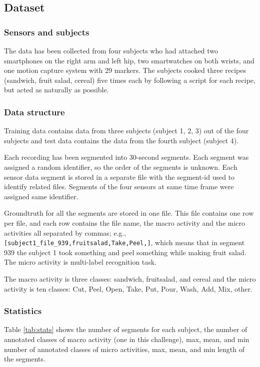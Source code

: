 \documentclass{svmult}
\begin{document}
\subsection{Dataset}
\label{sec:dataset}
\subsubsection{Sensors and subjects}
The data has been collected from four subjects who had attached two smartphones on the right arm and left hip, two smartwatches on both wrists, and one motion capture system with 29 markers. The subjects cooked three recipes (sandwich, fruit salad, cereal) five times each by following a script for each recipe, but acted as naturally as possible.

\subsubsection{Data structure}
Training data contains data from three subjects (subject 1, 2, 3) out of the four subjects and test data contains the data from the fourth subject (subject 4).

Each recording has been segmented into 30-second segments. Each segment was assigned a random identifier, so the order of the segments is unknown. Each sensor data segment is stored in a separate file with the segment-id used to identify related files. Segments of the four sensors at same time frame were assigned same identifier. 

Groundtruth for all the segments are stored in one file. This file contains one row per file, and each row contains the file name, the macro activity and the micro activities all separated by commas; e.g., {\tt [subject1\verb|_|file\verb|_|939,fruitsalad,Take,Peel,]}, which means that in segment 939 the subject 1 took something and peel something while making fruit salad. The micro activity is multi-label recognition task.

The macro activity is three classes: sandwich, fruitsalad, and cereal and the micro activity is ten classes: Cut, Peel, Open, Take, Put, Pour, Wash, Add, Mix, other.

\subsubsection{Statistics}
Table \ref{tab:stats} shows the number of segments for each subject, the number of annotated classes of macro activity (one in this challenge), max, mean, and min number of annotated classes of micro activities, max, mean, and min length of the segments.
\end{document}
